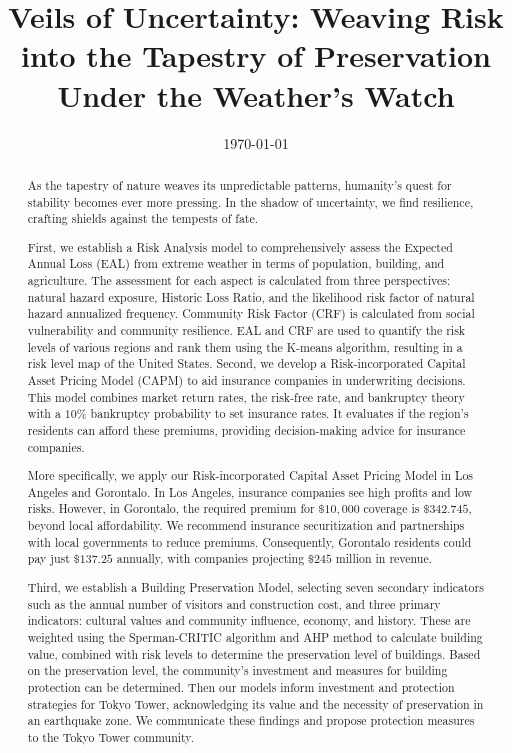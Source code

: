 \documentclass{mcmthesis}
\title{Veils of Uncertainty: Weaving Risk into the Tapestry of Preservation
Under the Weather's Watch}
\date{\today}
\begin{document}
\begin{abstract}
\par As the tapestry of nature weaves its unpredictable patterns, humanity’s quest for stability
becomes ever more pressing. In the shadow of uncertainty, we find resilience, crafting shields
against the tempests of fate.

First, we establish a Risk Analysis model to comprehensively assess the Expected Annual
Loss (EAL) from extreme weather in terms of population, building, and agriculture. The
assessment for each aspect is calculated from three perspectives: natural hazard exposure, Historic
Loss Ratio, and the likelihood risk factor of natural hazard annualized frequency. Community
Risk Factor (CRF) is calculated from social vulnerability and community resilience.
EAL and CRF are used to quantify the risk levels of various regions and rank them using the
K-means algorithm, resulting in a risk level map of the United States.
Second, we develop a Risk-incorporated Capital Asset Pricing Model (CAPM) to aid
insurance companies in underwriting decisions. This model combines market return rates, the
risk-free rate, and bankruptcy theory with a $10\%$ bankruptcy probability to set insurance rates.
It evaluates if the region's residents can afford these premiums, providing decision-making advice
for insurance companies.

More specifically, we apply our Risk-incorporated Capital Asset Pricing Model in Los
Angeles and Gorontalo. In Los Angeles, insurance companies see high profits and low risks.
However, in Gorontalo, the required premium for $\$10,000$ coverage is $\$342.745$, beyond local
affordability. We recommend insurance securitization and partnerships with local governments
to reduce premiums. Consequently, Gorontalo residents could pay just $\$137.25$ annually,
with companies projecting $\$245$ million in revenue.

Third, we establish a Building Preservation Model, selecting seven secondary indicators
such as the annual number of visitors and construction cost, and three primary indicators: cultural
values and community influence, economy, and history. These are weighted using the
Sperman-CRITIC algorithm and AHP method to calculate building value, combined with
risk levels to determine the preservation level of buildings. Based on the preservation level, the
community's investment and measures for building protection can be determined.
Then our models inform investment and protection strategies for Tokyo Tower, acknowledging
its value and the necessity of preservation in an earthquake zone. We communicate these
findings and propose protection measures to the Tokyo Tower community.


\end{abstract}
\end{document}
